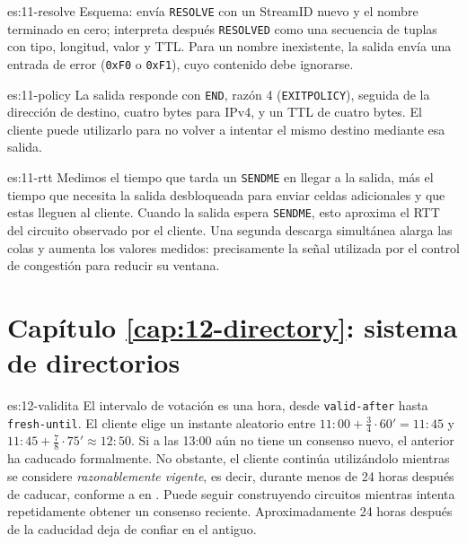 \begin{soluzione}{es:11-resolve}
Esquema: envía \texttt{RESOLVE} con un StreamID nuevo y el nombre terminado en cero; interpreta después \texttt{RESOLVED} como una secuencia de tuplas con tipo, longitud, valor y TTL. Para un nombre inexistente, la salida envía una entrada de error (\texttt{0xF0} o \texttt{0xF1}), cuyo contenido debe ignorarse.
\end{soluzione}

\begin{soluzione}{es:11-policy}
La salida responde con \texttt{END}, razón 4 (\texttt{EXITPOLICY}), seguida de la dirección de destino, cuatro bytes para IPv4, y un TTL de cuatro bytes. El cliente puede utilizarlo para no volver a intentar el mismo destino mediante esa salida.
\end{soluzione}

\begin{soluzione}{es:11-rtt}
Medimos el tiempo que tarda un \texttt{SENDME} en llegar a la salida, más el tiempo que necesita la salida desbloqueada para enviar celdas adicionales y que estas lleguen al cliente. Cuando la salida espera \texttt{SENDME}, esto aproxima el RTT del circuito observado por el cliente. Una segunda descarga simultánea alarga las colas y aumenta los valores medidos: precisamente la señal utilizada por el control de congestión para reducir su ventana.
\end{soluzione}

\section*{Capítulo \ref{cap:12-directory}: sistema de directorios}

\begin{soluzione}{es:12-validita}
El intervalo de votación es una hora, desde \texttt{valid-after} hasta \texttt{fresh-until}. El cliente elige un instante aleatorio entre $11{:}00+\tfrac34\cdot60'=11{:}45$ y $11{:}45+\tfrac78\cdot75'\approx12{:}50$. Si a las 13:00 aún no tiene un consenso nuevo, el anterior ha caducado formalmente. No obstante, el cliente continúa utilizándolo mientras se considere \emph{razonablemente vigente}, es decir, durante menos de 24 horas después de caducar, conforme a  en . Puede seguir construyendo circuitos mientras intenta repetidamente obtener un consenso reciente. Aproximadamente 24 horas después de la caducidad deja de confiar en el antiguo.
\end{soluzione}


